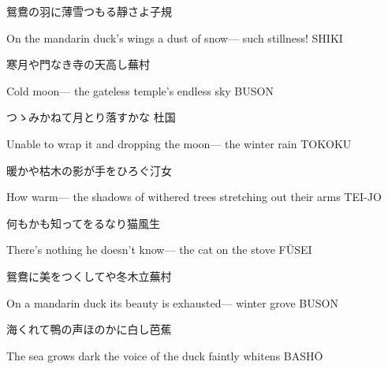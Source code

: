 \begin{haiku}
    {\FH 鴛鴦の羽に薄雪つもる靜さよ}\hfill{\FH 子規}

    \vin{} On the mandarin duck's wings
    \vin{} \vin{} a dust of snow---
    \vin{} \vin{} \vin{} such stillness! \hspace{\fill} SHIKI
\end{haiku}

\begin{haiku}
    {\FH 寒月や門なき寺の天高し}\hfill{\FH 蕪村}

    \vin{} Cold moon---
    \vin{} \vin{} the gateless temple's
    \vin{} \vin{} \vin{} endless sky \hspace{\fill} BUSON
\end{haiku}

\begin{haiku}
    {\FH つゝみかねて月とり落すかな }\hfill{\FH 杜国}

    \vin{} Unable to wrap it
    \vin{} \vin{} and dropping the moon---
    \vin{} \vin{} \vin{} the winter rain \hspace{\fill} TOKOKU
\end{haiku}

\begin{haiku}
    {\FH 暖かや枯木の影が手をひろぐ}\hfill{\FH 汀女}

    \vin{} How warm---
    \vin{} \vin{} the shadows of withered trees
    \vin{} \vin{} \vin{} stretching out their arms \hspace{\fill} TEI-JO
\end{haiku}

\begin{haiku}
    {\FH 何もかも知ってをるなり猫}\hfill{\FH 風生}

    \vin{} There's nothing
    \vin{} \vin{} he doesn't know---
    \vin{} \vin{} \vin{} the cat on the stove \hspace{\fill} F\={U}SEI
\end{haiku}

\begin{haiku}
    {\FH 鴛鴦に美をつくしてや冬木立}\hfill{\FH 蕪村}

    \vin{} On a mandarin duck
    \vin{} \vin{} its beauty is exhausted---
    \vin{} \vin{} \vin{} winter grove \hspace{\fill} BUSON
\end{haiku}

\begin{haiku}
    {\FH 海くれて鴨の声ほのかに白し}\hfill{\FH 芭蕉}

    \vin{} The sea grows dark
    \vin{} \vin{} the voice of the duck
    \vin{} \vin{} \vin{} faintly whitens \hspace{\fill} BASH\={O}
\end{haiku}

